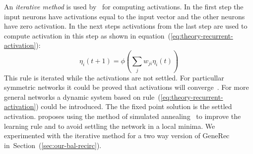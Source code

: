 An \emph{iterative method} is used by~\citet{movellan1990contrastive} for computing activations. In the first step the input neurons have activations equal to the input vector and the other neurons have zero activation. In the next steps activations from the last step are used to compute activation in this step as shown in equation~(\ref{eq:theory-recurrent-activation}): 
\begin{equation}
  \label{eq:theory-recurrent-activation} 
  \eta_i(t+1) = \phi\left(\sum_j w_{ji}\eta_i(t)\right) 
\end{equation}
This rule is iterated while the activations are not settled. For particullar symmetric networks it could be proved that activations will converge~\citep{o1996bio}. For more general networks a dynamic system based on rule~(\ref{eq:theory-recurrent-activation}) could be introduced. The the fixed point solution is the settled activation. \citet{movellan1990contrastive} proposes using the method of simulated annealing~\citep{kirkpatrick1983optimization,vcerny1985thermodynamical} to improve the learning rule and to avoid settling the network in a local minima. We experimented with the iterative method for a two way version of GeneRec in~Section~(\ref{sec:our-bal-recirc}). 

